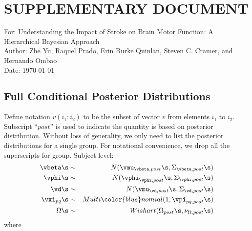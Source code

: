 \doublespace
\newpage
\section*{\uppercase{Supplementary Document}}
\setcounter{page}{1}
\setcounter{figure}{0}
{\large For: Understanding the Impact of Stroke on Brain Motor Function: A Hierarchical Bayesian Approach}\\
Author: Zhe Yu, Raquel Prado, Erin Burke Quinlan, Steven C. Cramer, and Hernando Ombao \\
Date: \today
\subsection*{Full Conditional Posterior Distributions}
Define notation $v(i_1:i_2)$ to be the subset of vector $v$ from elements $i_1$ to $i_2$. Subscript ``$post$'' is used to indicate the quantity is based on posterior distribution. Without loss of {\color{blue}generality}, we only need to list the posterior distributions for a single group. For notational convenience, we drop all the superscripts for group. 
Subject level:
\setcounter{equation}{0}
\begin{eqnarray}
\label{post-beta}
\vbeta\s &\sim& N(\vmu_{\vbeta,post}\s, \Sigma_{\vbeta,post}\s)\\
\label{post-phi}
\vphi\s &\sim& N(\vphi_{\vphi,post}\s, \Sigma_{\vphi,post}\s)\\
\label{post-d}
\vd\s &\sim& N(\vmu_{\vd,post}\s, \Sigma_{\vd,post}\s)\\
\label{post-xi}
\vxi_{pq}\s &\sim& Multi{\color{blue}nomial}(1, \vpi_{pq, post}\s)\\
\label{post-omega}
\Omega\s &\sim& Wishart(\Omega_{post}\s, \nu_{\Omega,post}\s) 
\end{eqnarray}
where   
